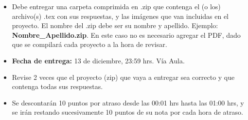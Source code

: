\begin{itemize}
    \item Debe entregar una carpeta comprimida en .zip que contenga el (o los) archivo(s) .tex con sus respuestas, y las imágenes que van incluidas en el proyecto. El nombre del .zip debe ser su nombre y apellido. Ejemplo:\\ \textbf{Nombre\_Apellido.zip}. En este caso no es necesario agregar el PDF, dado que se compilará cada proyecto a la hora de revisar.
    
    \item \textbf{Fecha de entrega:} 13 de diciembre, 23:59 hrs. Vía Aula.
    
    \item Revise 2 veces que el proyecto (zip) que vaya a entregar sea correcto y que contenga todas sus respuestas.
    
    \item Se descontarán 10 puntos por atraso desde las 00:01 hrs hasta las 01:00 hrs, y se irán restando sucesivamente 10 puntos de su nota por cada hora de atraso.
\end{itemize}
    